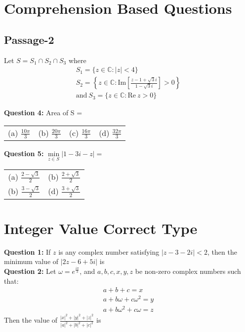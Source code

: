\documentclass[journal,12pt,twocolumn]{IEEEtran}
\theoremstyle{remark}
\newcommand{\RE}{\mathrm{Re}}
\newcommand{\IM}{\mathrm{Im}}
\begin{document}
\section{Comprehension Based Questions}

\subsection{Passage-2}

Let $S = S_1 \cap S_2 \cap S_3$ where
\begin{gather*}
S_1 = \{z \in \mathbb C: |z| < 4 \} \\
	S_2 = \left\{z \in \mathbb C: \IM\left[ \frac {z - 1 + \sqrt 3 i} {1 - \sqrt 3 i} \right] > 0 \right\} \\
	\text{and} \ S_3 = \{z \in \mathbb C: \RE\ z > 0\}
\end{gather*}

\textbf{Question 4:} Area of S = 
\hspace*{\fill} {\color{magenta}} \\

\begin{tabular}{ c c c c }
	(a) $\frac {10\pi} 3$ & (b) $\frac {20\pi} 3$ & (c) $\frac {16\pi} 3$ & (d) $\frac {32\pi} 3$
\end{tabular}

\textbf{Question 5:} $\min\limits_{z \in S} |1 - 3i - z| = $
\hspace*{\fill} {\color{magenta}} \\

\begin{tabular}{ c c }
	(a) $\frac {2 - \sqrt 3} 2$ & (b) $\frac {2 + \sqrt 3} 2$ \\
	(b) $\frac {3 -\sqrt 3} 2$ & (d) $\frac {3 + \sqrt 3} 2$
\end{tabular}

\section{Integer Value Correct Type}

\textbf{Question 1:} If $z$ is any complex number satisfying $|z - 3 - 2i| < 2$, then the
minimum value of $|2z - 6 + 5i|$ is
\hspace*{\fill} {\color{magenta}} \\

\textbf{Question 2:} Let $\omega = e^{\frac{i\pi}3}$, and $a, b, c, x, y, z$ be non-zero complex numbers such that:
\hspace*{\fill} {\color{magenta}} \\
\begin{gather*}
	a + b + c = x \\
	a + b\omega + c\omega^2 = y \\
	a + b\omega^2 + c\omega = z 
\end{gather*}
Then the value of $\frac {|x|^2 + |y|^2 + |z|^2} {|a|^2 + |b|^2 + |c|^2}$ is
\end{document}
